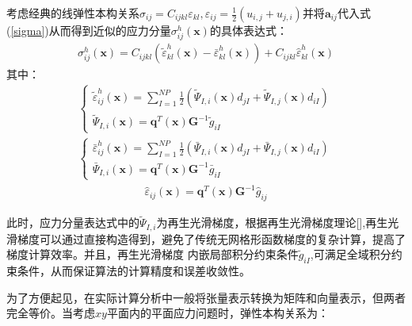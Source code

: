 考虑经典的线弹性本构关系$\sigma_{ij}=C_{ijkl}\varepsilon_{kl},\varepsilon_{ij}=\frac{1}{2}(u_{i,j}+u_{j,i})$并将$\pmb{a}_{ij}$代入式(\ref{sigma})从而得到近似的应力分量$\sigma^h_{ij}(\pmb{x})$的具体表达式：
\begin{equation}\label{sigmah}
\begin{split}
    \sigma^h_{ij}(\pmb{x})=C_{ijkl}(\tilde{\varepsilon}^h_{kl}(\pmb{x})-\bar{\varepsilon}^h_{kl}(\pmb{x}))+C_{ijkl}\hat{\varepsilon}^h_{kl}(\pmb{x})
\end{split}
\end{equation}
其中：
\begin{equation}
\begin{split}
\begin{cases}\label{case1}
    \tilde{\varepsilon}^h_{ij}(\pmb{x})=\displaystyle\sum_{I=1}^{N\!P}\frac{1}{2}(\tilde{\Psi}_{I,i}(\pmb{x})d_{jI}+\tilde{\Psi}_{I,j}(\pmb{x})d_{iI})\\
    \tilde{\Psi}_{I,i}(\pmb{x})=\pmb{q}^T(\pmb{x})\pmb{G}^{-1}\tilde{g}_{iI}
\end{cases}
\end{split}
\end{equation}
\begin{equation}
\begin{split}
\begin{cases}\label{case2}
    \bar{\varepsilon}^h_{ij}(\pmb{x})=\displaystyle\sum_{I=1}^{N\!P}\frac{1}{2}(\bar{\Psi}_{I,i}(\pmb{x})d_{jI}+\bar{\Psi}_{I,j}(\pmb{x})d_{iI})\\
    \bar{\Psi}_{I,i}(\pmb{x})=\pmb{q}^T(\pmb{x})\pmb{G}^{-1}\bar{g}_{iI}
\end{cases}
\end{split}
\end{equation}
\begin{equation}
\begin{split}\label{case3}
    \hat{\varepsilon}_{ij}(\pmb{x})=\pmb{q}^T(\pmb{x})\pmb{G}^{-1}\hat{g}_{ij}
\end{split}
\end{equation}\par
此时，应力分量表达式中的$\tilde{\Psi}_{I,i}$为再生光滑梯度，根据再生光滑梯度理论[],再生光滑梯度可以通过直接构造得到，避免了传统无网格形函数梯度的复杂计算，提高了梯度计算效率。并且，再生光滑梯度
内嵌局部积分约束条件$\tilde{g}_{iI}$,可满足全域积分约束条件，从而保证算法的计算精度和误差收敛性。\par
为了方便起见，在实际计算分析中一般将张量表示转换为矩阵和向量表示，但两者完全等价。当考虑$xy$平面内的平面应力问题时，弹性本构关系为：
